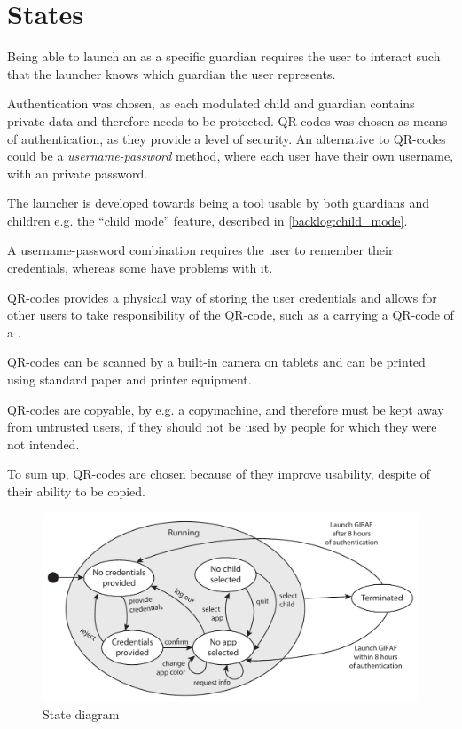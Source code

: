 \section{States}
Being able to launch an \girafapp[] as a specific guardian requires the user to interact such that the launcher knows which guardian the user represents.

Authentication was chosen, as each modulated child and guardian contains private data and therefore needs to be protected. QR-codes was chosen as means of authentication, as they provide a level of security.
An alternative to QR-codes could be a \emph{username-password} method, where each user have their own username, with an private password.

The launcher is developed towards being a tool usable by both guardians and children e.g. the ``child mode'' feature, described in \autoref{backlog:child_mode}.

A username-password combination requires the user to remember their credentials, whereas some \autists[] have problems with it.

 

QR-codes provides a physical way of storing the user credentials and allows for other users to take responsibility of the QR-code, such as a \guardian[] carrying a QR-code of a \autist[].

QR-codes can be scanned by a built-in camera on tablets and can be printed using standard paper and printer equipment. 

QR-codes are copyable, by e.g. a copymachine, and therefore must be kept away from untrusted users, if they should not be used by people for which they were not intended.

To sum up, QR-codes are chosen because of they improve usability, despite of their ability to be copied.  \\



\begin{figure}[h]
	\centering
	\includegraphics[width=1\textwidth]{gfx/statediagram.pdf}
	\caption{State diagram}
	\label{fig:state_diagram}
\end{figure}

